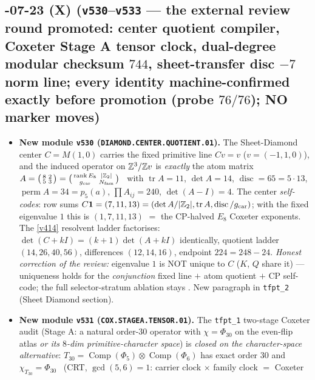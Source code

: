 \subsection*{-07-23 (X) (\texttt{v530}--\texttt{v533} --- the external review round promoted: center quotient compiler, Coxeter Stage A tensor clock, dual-degree modular checksum $744$, sheet-transfer disc $-7$ norm line; every identity machine-confirmed exactly before promotion (probe $76/76$); NO marker moves)}
\begin{itemize}[leftmargin=1.5em]
\item \textbf{New module \texttt{v530} (\texttt{DIAMOND.CENTER.QUOTIENT.01}).} The Sheet-Diamond center $C=M(1,0)$
carries the fixed primitive line $Cv=v$ ($v=(-1,1,0)$), and the induced operator on $\mathbb{Z}^3/\mathbb{Z} v$ is
\emph{exactly} the atom matrix $A=\big(\begin{smallmatrix}8&2\\5&3\end{smallmatrix}\big)
=\big(\begin{smallmatrix}\operatorname{rank}E_8&|\mathbb{Z}_2|\\ g_{\mathrm{car}}&N_{\mathrm{fam}}\end{smallmatrix}\big)$ \mE\ with
$\operatorname{tr}A=11$, $\det A=14$, $\operatorname{disc}=65=5\cdot13$, $\operatorname{perm}A=34=p_5(a)$,
$\prod A_{ij}=240$, $\det(A{-}I)=4$. The center \emph{self-codes}: row sums
$C\mathbf 1=(7,11,13)=(\det A/|\mathbb{Z}_2|,\operatorname{tr}A,\operatorname{disc}/g_{\mathrm{car}})$; with the fixed
eigenvalue $1$ this is $(1,7,11,13)$ $=$ the CP-halved $E_8$ Coxeter exponents. The \vref{v414} resolvent
ladder factorises: $\det(C{+}kI)=(k{+}1)\det(A{+}kI)$ identically, quotient ladder $(14,26,40,56)$,
differences $(12,14,16)$, endpoint $224=248-24$. \emph{Honest correction of the review:} eigenvalue $1$ is
NOT unique to $C$ ($K$, $Q$ share it) --- uniqueness holds for the \emph{conjunction} fixed line $+$ atom
quotient $+$ CP self-code; the full selector-stratum ablation stays \mO. New paragraph in
\texttt{tfpt\_2} (Sheet Diamond section).
\item \textbf{New module \texttt{v531} (\texttt{COX.STAGEA.TENSOR.01}).} The \texttt{tfpt\_1} two-stage Coxeter
audit (Stage A: a natural order-$30$ operator with $\chi=\Phi_{30}$ on the even-flip atlas \emph{or its
$8$-dim primitive-character space}) is \emph{closed on the character-space alternative}: $T_{30}=
\operatorname{Comp}(\Phi_5)\otimes\operatorname{Comp}(\Phi_6)$ has exact order $30$ and
$\chi_{T_{30}}=\Phi_{30}$ \mE\ (CRT, $\gcd(5,6)=1$: carrier clock $\times$ family clock $=$ Coxeter

\end{itemize}
